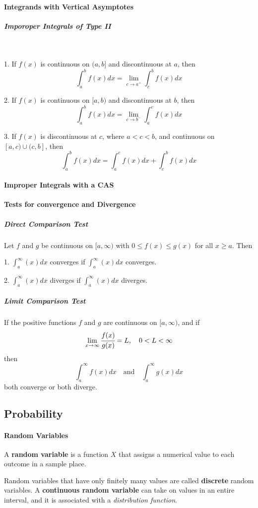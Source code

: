 \documentclass{article}
\begin{document}
            \paragraph{Integrands with Vertical Asymptotes}
                \subparagraph{Imporoper Integrals of Type II}\text{}\\
                \par 1. If $f(x)$ is continuous on $(a,b]$ and discontinuous at $a$, then
                \[\int_a^bf(x)dx=\lim\limits_{c\to a^+}\int_c^bf(x)dx\]
                \par 2. If $f(x)$ is continuous on $[a,b)$ and discontinuous at $b$, then
                \[\int_a^bf(x)dx=\lim\limits_{c\to b^-}\int_a^cf(x)dx\]
                \par 3. If $f(x)$ is discontinuous at $c$, where $a<c<b$, and continuous on $[a,c)\cup(c,b]$, then
                \[\int_a^bf(x)dx=\int_a^cf(x)dx+\int_c^bf(x)dx\]
            \paragraph{Improper Integrals with a CAS}
            \paragraph{Tests for convergence and Divergence}
                \subparagraph{Direct Comparison Test} Let $f$ and $g$ be continuous on $[a,\infty)$ with $0\le f(x)\le g(x)$ for all $x\ge a$. Then
                \par 1. $\int_a^\infty(x)dx$ converges if $\int_a^\infty(x)dx$ converges.
                \par 2. $\int_a^\infty(x)dx$ diverges if $\int_a^\infty(x)dx$ diverges.
                \subparagraph{Limit Comparison Test} If the positive functions $f$ and $g$ are continuous on $[a,\infty)$, and if 
                \[\lim\limits_{x\to \infty}\cfrac{f(x)}{g(x)}=L,\quad 0<L<\infty\]
                then
                \[\int_a^\infty f(x)dx\quad\text{and}\quad\int_a^\infty g(x)dx\]
                both converge or both diverge.
        \subsection{Probability}
            \paragraph{Random Variables}
            A \textbf{random variable} is a function $X$ that assigns a numerical value to each outcome in a sample place.
            \par Random variables that have only finitely many values are called \textbf{discrete} random variables. A \textbf{continuous random variable} can take on values in an entire interval, and it is associated with a \textit{distribution function}.
\end{document}
